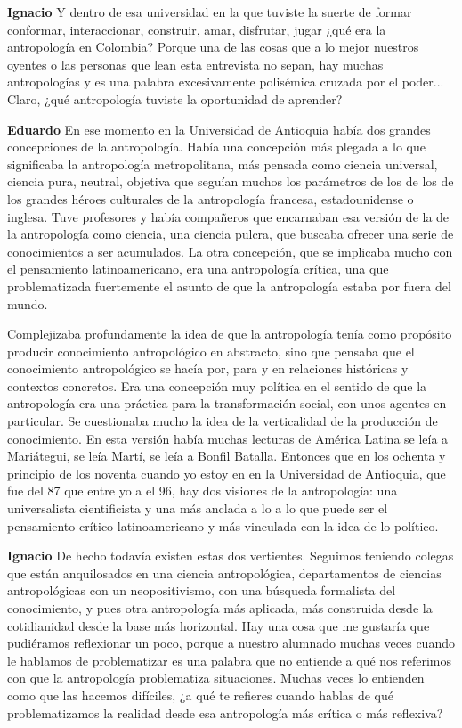 \documentclass[
  spanish,
  11pt,
  a4paper,
]{scrbook}
\newenvironment{transcripcion}{
    \begin{list}{}{
        \setlength{\leftmargin}{1.5em}  %
        \setlength{\rightmargin}{0em}
        \setlength{\itemsep}{0.2em}     %
        \setlength{\parsep}{0.0em}
        \setlength{\listparindent}{0pt}
    }
}{
    \end{list}
}
\newcommand{\personaje}[1]{\textbf{#1}\quad}
\begin{document}
\begin{transcripcion}
\item \personaje{Ignacio} Y dentro de esa universidad en la que tuviste la suerte de formar conformar, interaccionar, construir, amar, disfrutar, jugar ¿qué era la antropología en Colombia? Porque una de las cosas que a lo mejor nuestros oyentes o las personas que lean esta entrevista no sepan, hay muchas antropologías y es una palabra excesivamente polisémica cruzada por el poder... Claro, ¿qué antropología tuviste la oportunidad de aprender?

\item \personaje{Eduardo} En ese momento en la Universidad de Antioquia había dos grandes concepciones de la antropología. Había una concepción más plegada a lo que significaba la antropología metropolitana, más pensada como ciencia universal, ciencia pura, neutral, objetiva que seguían muchos los parámetros de los de los de los grandes héroes culturales de la antropología francesa, estadounidense o inglesa. Tuve profesores y había compañeros que encarnaban esa versión de la de la antropología como ciencia, una ciencia pulcra, que buscaba ofrecer una serie de conocimientos a ser acumulados. La otra concepción, que se implicaba mucho con el pensamiento latinoamericano, era una antropología crítica, una que problematizada fuertemente el asunto de que la antropología estaba por fuera del mundo.

Complejizaba profundamente la idea de que la antropología tenía como propósito producir conocimiento antropológico en abstracto, sino que pensaba que el conocimiento antropológico se hacía por, para y en relaciones históricas y contextos concretos. Era una concepción muy política en el sentido de que la antropología era una práctica para la transformación social, con unos agentes en particular. Se cuestionaba mucho la idea de la verticalidad de la producción de conocimiento. En esta versión había muchas lecturas de América Latina se leía a Mariátegui, se leía Martí, se leía a Bonfil Batalla. Entonces que en los ochenta y principio de los noventa cuando yo estoy en en la Universidad de Antioquia, que fue del 87 que entre yo a el 96, hay dos visiones de la antropología: una universalista cientificista y una más anclada a lo a lo que puede ser el pensamiento crítico latinoamericano y más vinculada con la idea de lo político.

\item \personaje{Ignacio} De hecho todavía existen estas dos vertientes. Seguimos teniendo colegas que están anquilosados en una ciencia antropológica, departamentos de ciencias antropológicas con un neopositivismo, con una búsqueda formalista del conocimiento, y pues otra antropología más aplicada, más construida desde la cotidianidad desde la base más horizontal. Hay una cosa que me gustaría que pudiéramos reflexionar un poco, porque a nuestro alumnado muchas veces cuando le hablamos de problematizar es una palabra que no entiende a qué nos referimos con que la antropología problematiza situaciones. Muchas veces lo entienden como que las hacemos difíciles, ¿a qué te refieres cuando hablas de qué problematizamos la realidad desde esa antropología más crítica o más reflexiva?


\end{transcripcion}
\end{document}
